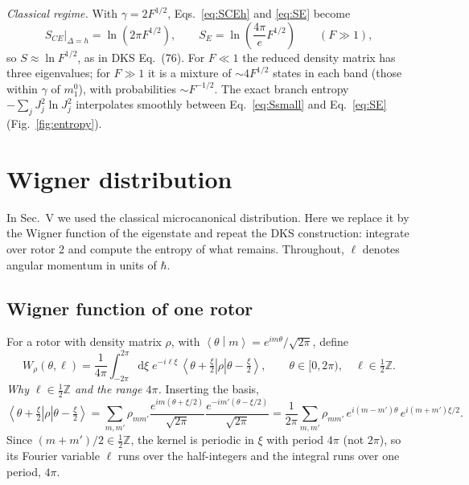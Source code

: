 \documentclass[aps,pra,onecolumn,notitlepage,nofootinbib,11pt]{revtex4-2}
\newcommand{\ket}[1]{\left|#1\right\rangle}
\newcommand{\bra}[1]{\left\langle#1\right|}
\newcommand{\braket}[2]{\left\langle#1\middle|#2\right\rangle}
\newcommand{\dd}{\mathrm{d}}
\begin{document}
\emph{Classical regime.} With $\gamma=2F^{1/2}$, Eqs.~\eqref{eq:SCEh} and \eqref{eq:SE} become
\begin{equation}
S_{CE}\big|_{\Delta=h}=\ln\left(2\pi F^{1/2}\right),\qquad
S_{E}=\ln\left(\frac{4\pi}{e}F^{1/2}\right)\qquad(F\gg1),
\end{equation}
so $S\approx\ln F^{1/2}$, as in DKS Eq.~(76). For $F\ll1$ the reduced density matrix has
three eigenvalues; for $F\gg1$ it is a mixture of $\sim4F^{1/2}$ states in each band
(those within $\gamma$ of $m_{1}^{0}$), with probabilities $\sim F^{-1/2}$. The exact branch entropy $-\sum_{j}J_{j}^{2}\ln J_{j}^{2}$
interpolates smoothly between Eq.~\eqref{eq:Ssmall} and Eq.~\eqref{eq:SE}
(Fig.~\ref{fig:entropy}).

\section{Wigner distribution}
\label{sec:wigner}

In Sec.~V we used the classical microcanonical distribution. Here we replace it by
the Wigner function of the eigenstate and repeat the DKS construction: integrate over
rotor 2 and compute the entropy of what remains. Throughout, $\ell$ denotes angular
momentum in units of $\hbar$.

\subsection{Wigner function of one rotor}

For a rotor with density matrix $\rho$, with $\braket{\theta}{m}=e^{im\theta}/\sqrt{2\pi}$,
define
\begin{equation}
W_{\rho}(\theta,\ell)=\frac{1}{4\pi}\int_{-2\pi}^{2\pi}\dd\xi\;e^{-i\ell\xi}\,
\bra{\theta+\tfrac{\xi}{2}}\rho\ket{\theta-\tfrac{\xi}{2}},\qquad
\theta\in[0,2\pi),\quad\ell\in\tfrac12\mathbb{Z}.
\label{eq:Wdef}
\end{equation}
\emph{Why $\ell\in\frac12\mathbb{Z}$ and the range $4\pi$.} Inserting the basis,
\begin{equation}
\bra{\theta+\tfrac{\xi}{2}}\rho\ket{\theta-\tfrac{\xi}{2}}
=\sum_{m,m'}\rho_{mm'}\frac{e^{im(\theta+\xi/2)}}{\sqrt{2\pi}}\frac{e^{-im'(\theta-\xi/2)}}{\sqrt{2\pi}}
=\frac{1}{2\pi}\sum_{m,m'}\rho_{mm'}\,e^{i(m-m')\theta}\,e^{i(m+m')\xi/2}.
\label{eq:kernel}
\end{equation}
Since $(m+m')/2\in\frac12\mathbb{Z}$, the kernel is periodic in $\xi$ with period $4\pi$
(not $2\pi$), so its Fourier variable $\ell$ runs over the half-integers and the
integral runs over one period, $4\pi$.
\end{document}
